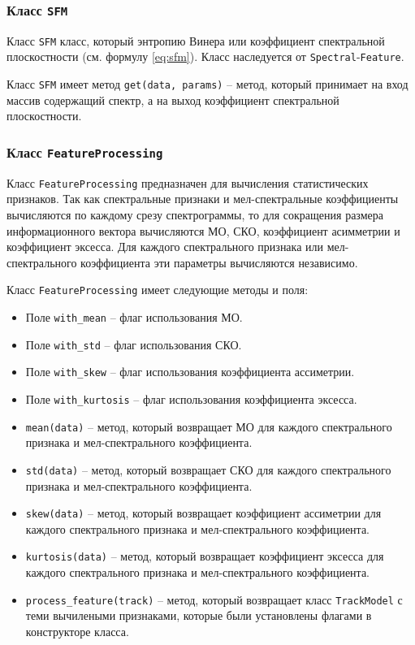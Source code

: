 \subsubsection{Класс \texttt{SFM}}

Класс \texttt{SFM} класс, который энтропию Винера или коэффициент спектральной плоскостности (см. формулу \ref{eq:sfm}). Класс наследуется от \texttt{Spectral}-\texttt{Feature}.

Класс \texttt{SFM} имеет метод \texttt{get(data, params)} --  метод, который принимает на вход массив содержащий спектр, а на выход коэффициент спектральной плоскостности.



\subsubsection{Класс \texttt{FeatureProcessing}}

Класс \texttt{FeatureProcessing} предназначен для вычисления статистических признаков. Так как спектральные признаки и мел-спектральные коэффициенты вычисляются по каждому срезу спектрограммы, то для сокращения размера информационного вектора вычисляются МО, СКО, коэффициент асимметрии и коэффициент эксесса. Для каждого спектрального признака или мел-спектрального коэффициента эти параметры вычисляются независимо.

Класс \texttt{FeatureProcessing} имеет следующие методы и поля:

\begin{itemize}
\item{Поле \texttt{with\_mean} -- флаг использования МО.}
\item{Поле \texttt{with\_std} --  флаг использования СКО.}
\item{Поле \texttt{with\_skew} -- флаг использования коэффициента ассиметрии.}
\item{Поле \texttt{with\_kurtosis} -- флаг использования коэффициента эксесса.}
\item{\texttt{mean(data)} -- метод, который возвращает МО для каждого спектрального признака и мел-спектрального коэффициента.}
\item{\texttt{std(data)} -- метод, который возвращает СКО для каждого спектрального признака и мел-спектрального коэффициента. }
\item{\texttt{skew(data)} -- метод, который возвращает коэффициент ассиметрии для каждого спектрального признака и мел-спектрального коэффициента.}
\item{\texttt{kurtosis(data)} -- метод, который возвращает коэффициент эксесса для каждого спектрального признака и мел-спектрального коэффициента. }
\item{\texttt{process\_feature(track)} -- метод, который возвращает класс \texttt{TrackModel} с теми вычилеными признаками, которые были установлены флагами в конструкторе класса.}
\end{itemize}

